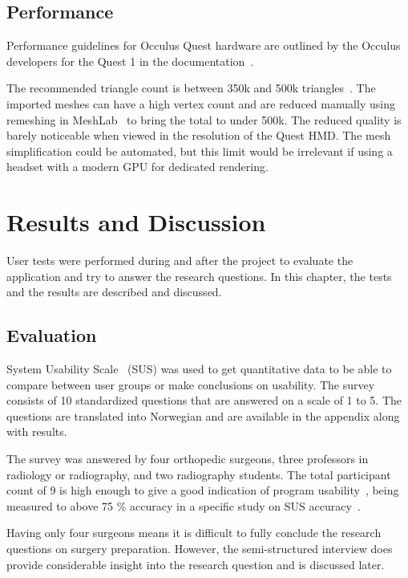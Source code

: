 \documentclass[a4paper]{report}
\begin{document}
\section{Performance}
Performance guidelines for Occulus Quest hardware are outlined by the Occulus developers for the Quest 1 in the documentation~\cite{noauthor_oculus_nodate}.

The recommended triangle count is between 350k and 500k triangles~\cite{noauthor_performance_nodate}. The imported meshes can have a high vertex count and are reduced manually using remeshing in MeshLab~\cite{cignoni_meshlab_2008} to bring the total to under 500k. The reduced quality is barely noticeable when viewed in the resolution of the Quest HMD.
The mesh simplification could be automated, but this limit would be irrelevant if using a headset with a modern GPU for dedicated rendering.



\chapter{Results and Discussion}

User tests were performed during and after the project to evaluate the application and try to answer the research questions. In this chapter, the tests and the results are described and discussed.

\section{Evaluation}

System Usability Scale~\cite{system_usability_scale_sus_system_2013} (SUS) was used to get quantitative data to be able to compare between user groups or make conclusions on usability.
The survey consists of 10 standardized questions that are answered on a scale of 1 to 5. The questions are translated into Norwegian and are available in the appendix along with results.

The survey was answered by four orthopedic surgeons, three professors in radiology or radiography, and two radiography students. The total participant count of 9 is high enough to give a good indication of program usability~\cite{experience_why_nodate}, being measured to above 75 \% accuracy in a specific study on SUS accuracy~\cite{tullis_comparison_nodate}.

Having only four surgeons means it is difficult to fully conclude the research questions on surgery preparation. However, the semi-structured interview does provide considerable insight into the research question and is discussed later.
\end{document}
